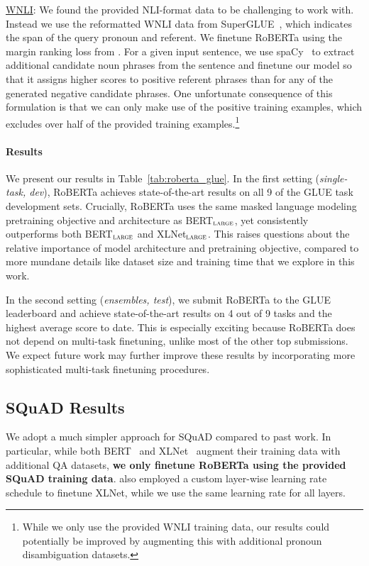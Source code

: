 \underline{WNLI}: We found the provided NLI-format data to be challenging to work with. Instead we use the reformatted WNLI data from SuperGLUE~\cite{wang2019superglue}, which indicates the span of the query pronoun and referent. We finetune RoBERTa using the margin ranking loss from .
For a given input sentence, we use spaCy~\cite{spacy2} to extract additional candidate noun phrases from the sentence and finetune our model so that it assigns higher scores to positive referent phrases than for any of the generated negative candidate phrases. One unfortunate consequence of this formulation is that we can only make use of the positive training examples, which excludes over half of the provided training examples.\footnote{While we only use the provided WNLI training data, our results could potentially be improved by augmenting this with additional pronoun disambiguation datasets.}

\paragraph{Results}

We present our results in Table~\ref{tab:roberta_glue}.
In the first setting (\emph{single-task, dev}), RoBERTa achieves state-of-the-art results on all 9 of the GLUE task development sets. Crucially, RoBERTa uses the same masked language modeling pretraining objective and architecture as BERT$_{\textsc{large}}$, yet consistently outperforms both BERT$_{\textsc{large}}$ and XLNet$_{\textsc{large}}$.
This raises questions about the relative importance of model architecture and pretraining objective, compared to more mundane details like dataset size and training time that we explore in this work.

In the second setting (\emph{ensembles, test}), we submit RoBERTa to the GLUE leaderboard and achieve state-of-the-art results on 4 out of 9 tasks and the highest average score to date. This is especially exciting because RoBERTa does not depend on multi-task finetuning, unlike most of the other top submissions. We expect future work may further improve these results by incorporating more sophisticated multi-task finetuning procedures.

\subsection{SQuAD Results} \label{sec:results_squad}

We adopt a much simpler approach for SQuAD compared to past work. In particular, while both BERT~\cite{devlin2018bert} and XLNet~\cite{yang2019xlnet} augment their training data with additional QA datasets, \textbf{we only finetune RoBERTa using the provided SQuAD training data}.
 also employed a custom layer-wise learning rate schedule to finetune XLNet, while we use the same learning rate for all layers.

